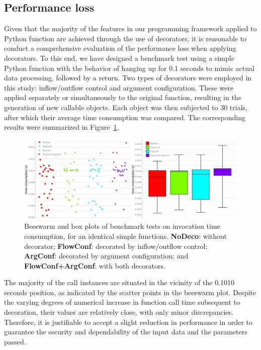 \documentclass[a4paper,12pt]{article}
\newcommand{\myfig}[1]{{\color{black}Figure~\ref{#1}}}
\begin{document}
\subsection*{Performance loss}

Given that the majority of the features in our programming framework applied to Python function are achieved through the use of decorators, it is reasonable to conduct a comprehensive evaluation of the performance loss when applying decorators. To this end, we have designed a benchmark test using a simple Python function with the behavior of hanging up for 0.1 seconds to mimic actual data processing, followed by a return. Two types of decorators were employed in this study: inflow/outflow control and argument configuration. These were applied separately or simultaneously to the original function, resulting in the generation of new callable objects. Each object was then subjected to 30 trials, after which their average time consumption was compared. The corresponding results were summarized in \myfig{tag11}.\par

\begin{figure}[htbp]
  \centering
  \includegraphics[scale=0.45]{benchmark.jpg}
  \caption{Beeswarm and box plots of benchmark tests on invocation time consumption, for an identical simple functions. \textbf{NoDeco}: without decorator; \textbf{FlowConf}: decorated by inflow/outflow control; \textbf{ArgConf}: decorated by argument configuration; and \textbf{FlowConf+ArgConf}: with both decorators.}
  \label{tag11}
\end{figure}

The majority of the call instances are situated in the vicinity of the 0.1010 seconds position, as indicated by the scatter points in the beeswarm plot. Despite the varying degrees of numerical increase in function call time subsequent to decoration, their values are relatively close, with only minor discrepancies. Therefore, it is justifiable to accept a slight reduction in performance in order to guarantee the security and dependability of the input data and the parameters passed.\par
\end{document}
